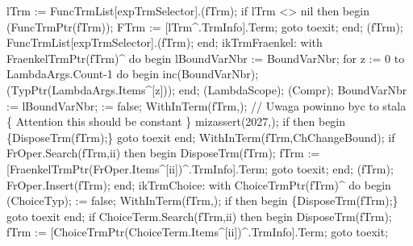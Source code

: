             lTrm := FuncTrmList[expTrmSelector].(fTrm);
            if lTrm <> nil then
            begin
               (FuncTrmPtr(fTrm));
               FTrm := [lTrm^.TrmInfo].Term;
               goto toexit;
            end;
            (fTrm);
            FuncTrmList[expTrmSelector].(fTrm);
         end;
         ikTrmFraenkel:
            with FraenkelTrmPtr(fTrm)^ do
         begin
            lBoundVarNbr := BoundVarNbr;
            for z := 0 to LambdaArgs.Count-1 do
            begin
               inc(BoundVarNbr);
               (TypPtr(LambdaArgs.Items^[z]));
            end;
            (LambdaScope);
            (Compr);
            BoundVarNbr := lBoundVarNbr;
             := false;
            WithInTerm(fTrm,);
            // Uwaga powinno byc to stala
            \{ Attention this should be constant \}
            mizassert(2027,);
            if  then
            begin \{DisposeTrm(fTrm);\}
               goto toexit
            end;
            WithInTerm(fTrm,ChChangeBound);
            if FrOper.Search(fTrm,ii) then
            begin
               DisposeTrm(fTrm);
               fTrm := [FraenkelTrmPtr(FrOper.Items^[ii])^.TrmInfo].Term;
               goto toexit;
            end;
            (fTrm);
            FrOper.Insert(fTrm);
         end;
         ikTrmChoice:
            with ChoiceTrmPtr(fTrm)^ do
         begin
            (ChoiceTyp);
             := false;
            WithInTerm(fTrm,);
            if  then
            begin \{DisposeTrm(fTrm);\}
               goto toexit
            end;
            if ChoiceTerm.Search(fTrm,ii) then
            begin
               DisposeTrm(fTrm);
               fTrm := [ChoiceTrmPtr(ChoiceTerm.Items^[ii])^.TrmInfo].Term;
               goto toexit;
